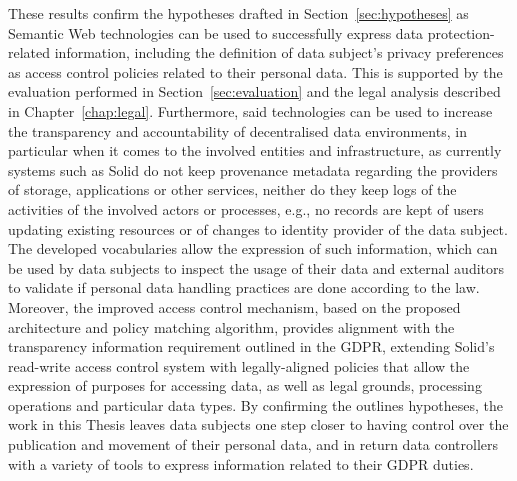 These results confirm the hypotheses drafted in Section~\ref{sec:hypotheses} as Semantic Web technologies can be used to successfully express data protection-related information, including the definition of data subject's privacy preferences as access control policies related to their personal data.
This is supported by the evaluation performed in Section~\ref{sec:evaluation} and the legal analysis described in Chapter~\ref{chap:legal}.
Furthermore, said technologies can be used to increase the transparency and accountability of decentralised data environments, in particular when it comes to the involved entities and infrastructure, as currently systems such as Solid do not keep provenance metadata regarding the providers of storage, applications or other services, neither do they keep logs of the activities of the involved actors or processes, e.g., no records are kept of users updating existing resources or of changes to identity provider of the data subject.
The developed vocabularies allow the expression of such information, which can be used by data subjects to inspect the usage of their data and external auditors to validate if personal data handling practices are done according to the law.
Moreover, the improved access control mechanism, based on the proposed architecture and policy matching algorithm, provides alignment with the transparency information requirement outlined in the GDPR, extending Solid's read-write access control system with legally-aligned policies that allow the expression of purposes for accessing data, as well as legal grounds, processing operations and particular data types.
By confirming the outlines hypotheses, the work in this Thesis leaves data subjects one step closer to having control over the publication and movement of their personal data, and in return data controllers with a variety of tools to express information related to their GDPR duties.